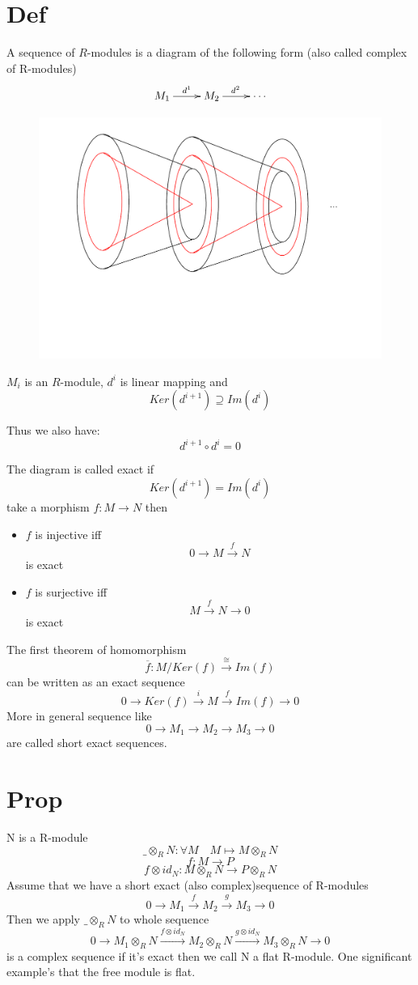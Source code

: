 \documentclass{book}
\begin{document}
\section{Def}
A sequence of $R$-modules is a diagram of the following form (also called complex of R-modules)
$$\xymatrix{
    M_1\ar[r]^{d^1} & M_2\ar[r]^{d^2} & \cdots
}$$
\begin{figure}[!h]
    \centering
    \includegraphics[scale=0.3]{img/1.pdf}
\end{figure}

$M_i$ is an $R$-module, $d^i$ is linear mapping and $$Ker(d^{i+1})\supseteq Im(d^i)$$ 

Thus we also have: $$d^{i+1}\circ d^i=0$$

The diagram is called exact if $$Ker(d^{i+1})=Im(d^i)$$
take a morphism $f:M\rightarrow N$ then 
\begin{itemize}
    \item $f$ is injective iff $$0\rightarrow M \stackrel{f}{\rightarrow} N$$ is exact
    \item $f$ is surjective iff $$M\stackrel{f}\rightarrow N\rightarrow 0$$ is exact
\end{itemize}
The first theorem of homomorphism 
$$\overline{f}:M/Ker(f)\stackrel{\cong}{\rightarrow}Im(f)$$
can be written as an exact sequence
$$0\rightarrow Ker(f)\stackrel{i}{\rightarrow}M\stackrel{f}{\rightarrow}Im(f)\rightarrow 0$$
More in general sequence like
$$0\rightarrow M_1\rightarrow M_2\rightarrow M_3\rightarrow 0$$
are called short exact sequences.
\section{Prop}
N is a R-module 
$$\_\otimes_RN:\forall M\quad M\mapsto M\otimes_RN$$
$$f:M\rightarrow P$$
$$f\otimes id_N:M\otimes_RN\rightarrow P\otimes_RN$$
Assume that we have a short exact (also complex)sequence of R-modules
$$0\rightarrow M_1\stackrel{f}{\rightarrow}M_2\stackrel{g}{\rightarrow}M_3\rightarrow 0$$
Then we apply $\_\otimes_RN$ to whole sequence
$$0\rightarrow M_1\otimes_RN\stackrel{f\otimes id_N}{\rightarrow}M_2\otimes_RN\stackrel{g\otimes id_N}{\rightarrow}M_3\otimes_RN\rightarrow 0$$
is a complex sequence if it's exact then we call N a flat R-module. One significant example's that the free module is flat.
\end{document}
